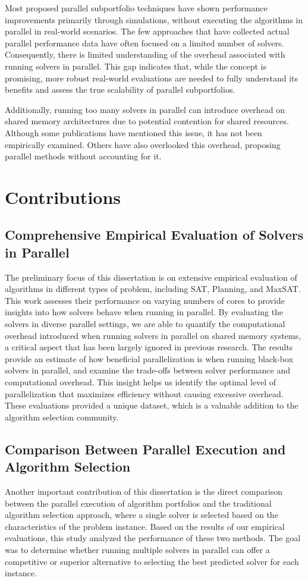Most proposed parallel subportfolio techniques have shown performance improvements primarily through simulations, without executing the algorithms in parallel in real-world scenarios. The few approaches that have collected actual parallel performance data have often focused on a limited number of solvers. Consequently, there is limited understanding of the overhead associated with running solvers in parallel. This gap indicates that, while the concept is promising, more robust real-world evaluations are needed to fully understand its benefits and assess the true scalability of parallel subportfolios.

Additionally, running too many solvers in parallel can introduce overhead on shared memory architectures due to potential contention for shared resources. Although some publications have mentioned this issue, it has not been empirically examined. Others have also overlooked this overhead, proposing parallel methods without accounting for it.

\section{Contributions}

\subsection{Comprehensive Empirical Evaluation of Solvers in Parallel}
The preliminary focus of this dissertation is on extensive empirical evaluation of algorithms in different types of problem, including SAT, Planning, and MaxSAT. This work assesses their performance on varying numbers of cores to provide insights into how solvers behave when running in parallel. By evaluating the solvers in diverse parallel settings, we are able to quantify the computational overhead introduced when running solvers in parallel on shared memory systems, a critical aspect that has been largely ignored in previous research. The results provide an estimate of how beneficial parallelization is when running black-box solvers in parallel, and examine the trade-offs between solver performance and computational overhead. This insight helps us identify the optimal level of parallelization that maximizes efficiency without causing excessive overhead. These evaluations provided a unique dataset, which is a valuable addition to the algorithm selection community.

\subsection{Comparison Between Parallel Execution and Algorithm Selection}
Another important contribution of this dissertation is the direct comparison between the parallel execution of algorithm portfolios and the traditional algorithm selection approach, where a single solver is selected based on the characteristics of the problem instance. Based on the results of our empirical evaluations, this study analyzed the performance of these two methods. The goal was to determine whether running multiple solvers in parallel can offer a competitive or superior alternative to selecting the best predicted solver for each instance.

